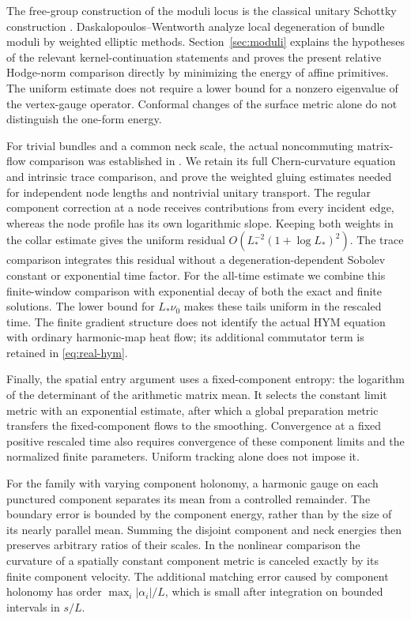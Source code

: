 The free-group construction of the moduli locus is
the classical unitary Schottky construction
\cite{florentino}. Daskalopoulos--Wentworth
\cite{dw-local} analyze local degeneration of
bundle moduli by weighted elliptic methods.
Section~\ref{sec:moduli} explains the hypotheses
of the relevant kernel-continuation statements
and proves the present relative Hodge-norm
comparison directly by minimizing the energy
of affine primitives. The uniform estimate does
not require a lower bound for a nonzero
eigenvalue of the vertex-gauge operator.
Conformal changes of the surface metric alone
do not distinguish the one-form energy.

For trivial bundles and a common neck scale,
the actual noncommuting matrix-flow comparison
was established in \cite{wuebben-hym}.
We retain its full Chern-curvature equation and
intrinsic trace comparison, and prove the
weighted gluing estimates needed for independent
node lengths and nontrivial unitary transport.
The regular component correction at a node
receives contributions from every incident
edge, whereas the node profile has its own
logarithmic slope. Keeping both weights in
the collar estimate gives the uniform residual
$O(L_*^{-2}(1+\log L_*)^2)$.
The trace comparison integrates this residual
without a degeneration-dependent Sobolev
constant or exponential time factor.
For the all-time estimate we combine this
finite-window comparison with exponential
decay of both the exact and finite solutions.
The lower bound for $L_*\nu_0$ makes these
tails uniform in the rescaled time.
The finite gradient structure does not identify
the actual HYM equation with ordinary
harmonic-map heat flow; its additional
commutator term is retained in
\eqref{eq:real-hym}.

Finally, the spatial entry argument uses a
fixed-component entropy: the logarithm of
the determinant of the arithmetic matrix mean.
It selects the constant limit metric with an
exponential estimate, after which a global
preparation metric transfers the fixed-component
flows to the smoothing. Convergence at a
fixed positive rescaled time also requires
convergence of these component limits and
the normalized finite parameters.
Uniform tracking alone does not impose it.

For the family with varying component
holonomy, a harmonic gauge on each punctured
component separates its mean from a controlled
remainder. The boundary error is bounded by
the component energy, rather than by the
size of its nearly parallel mean. Summing
the disjoint component and neck energies
then preserves arbitrary ratios of their
scales. In the nonlinear comparison the
curvature of a spatially constant component
metric is canceled exactly by its finite
component velocity. The additional matching
error caused by component holonomy has order
$\max_i|\alpha_i|/L$, which
is small after integration on bounded
intervals in $s/L$.

